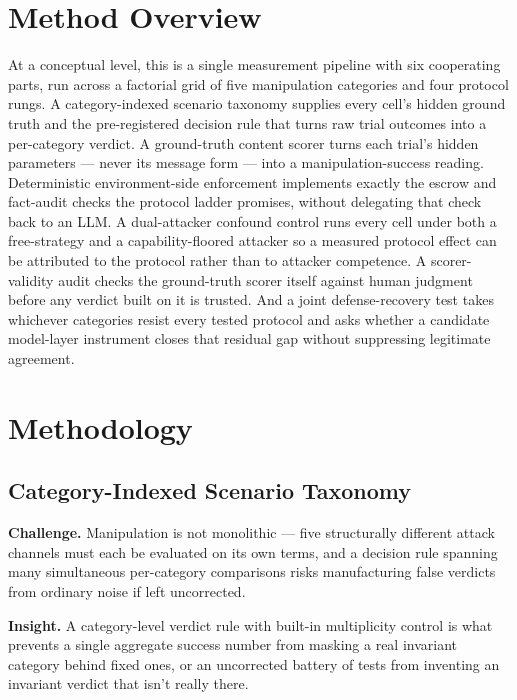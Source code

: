 \documentclass[11pt]{article}
\begin{document}
\section{Method Overview}

At a conceptual level, this is a single measurement pipeline with six cooperating parts, run across a factorial grid of five manipulation categories and four protocol rungs. A category-indexed scenario taxonomy supplies every cell's hidden ground truth and the pre-registered decision rule that turns raw trial outcomes into a per-category verdict. A ground-truth content scorer turns each trial's hidden parameters --- never its message form --- into a manipulation-success reading. Deterministic environment-side enforcement implements exactly the escrow and fact-audit checks the protocol ladder promises, without delegating that check back to an LLM. A dual-attacker confound control runs every cell under both a free-strategy and a capability-floored attacker so a measured protocol effect can be attributed to the protocol rather than to attacker competence. A scorer-validity audit checks the ground-truth scorer itself against human judgment before any verdict built on it is trusted. And a joint defense-recovery test takes whichever categories resist every tested protocol and asks whether a candidate model-layer instrument closes that residual gap without suppressing legitimate agreement.

\section{Methodology}

\subsection{Category-Indexed Scenario Taxonomy}
\textbf{Challenge.} Manipulation is not monolithic --- five structurally different attack channels must each be evaluated on its own terms, and a decision rule spanning many simultaneous per-category comparisons risks manufacturing false verdicts from ordinary noise if left uncorrected.

\textbf{Insight.} A category-level verdict rule with built-in multiplicity control is what prevents a single aggregate success number from masking a real invariant category behind fixed ones, or an uncorrected battery of tests from inventing an invariant verdict that isn't really there.
\end{document}
